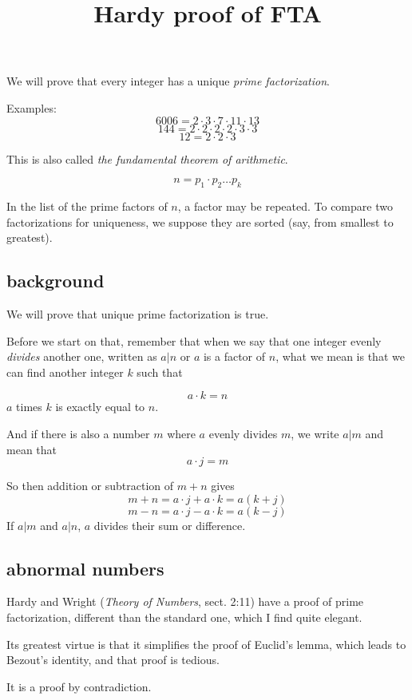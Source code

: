 \documentclass[11pt, oneside]{article}
\title{Hardy proof of FTA}
\date{}
\begin{document}
\maketitle
\Large

We will prove that every integer has a unique \emph{prime factorization}.  

Examples:
\[ 6006 = 2 \cdot 3 \cdot 7 \cdot 11 \cdot 13 \]
\[ 144 = 2 \cdot 2 \cdot 2 \cdot 2 \cdot 3 \cdot 3 \]
\[ 12 = 2 \cdot 2 \cdot 3 \]

This is also called \emph{the fundamental theorem of arithmetic}.

\[ n = p_1 \cdot p_2 \dots p_k \]

In the list of the prime factors of $n$, a factor may be repeated.  To compare two factorizations for uniqueness, we suppose they are sorted (say, from smallest to greatest).

\subsection*{background}

We will prove that unique prime factorization is true.

Before we start on that, remember that when we say that one integer evenly \emph{divides} another one, written as $a|n$ or $a$ is a factor of $n$, what we mean is that we can find another integer $k$ such that

\[ a \cdot k = n \]
$a$ times $k$ is exactly equal to $n$.

And if there is also a number $m$ where $a$ evenly divides $m$, we write $a|m$ and mean that
\[ a \cdot j = m \]

So then addition or subtraction of $m + n$ gives
\[ m + n = a \cdot j + a \cdot k = a(k + j) \]
\[ m - n = a \cdot j - a \cdot k = a(k - j) \]
If $a|m$ and $a|n$, $a$ divides their sum or difference.

\subsection*{abnormal numbers}

Hardy and Wright (\emph{Theory of Numbers}, sect. 2:11) have a proof of prime factorization, different than the standard one, which I find quite elegant.

Its greatest virtue is that it simplifies the proof of Euclid's lemma, which leads to Bezout's identity, and that proof is tedious.

It is a proof by contradiction.
\end{document}
